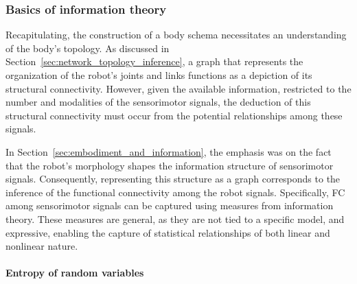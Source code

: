 \subsubsection{Basics of information theory}
Recapitulating, the construction of a body schema necessitates an understanding of the body's topology. As discussed in Section~\ref{sec:network_topology_inference}, a graph that represents the organization of the robot's joints and links functions as a depiction of its structural connectivity. However, given the available information, restricted to the number and modalities of the sensorimotor signals, the deduction of this structural connectivity must occur from the potential relationships among these signals.

In Section~\ref{sec:embodiment_and_information}, the emphasis was on the fact that the robot's morphology shapes the information structure of sensorimotor signals. Consequently, representing this structure as a graph corresponds to the inference of the functional connectivity among the robot signals. Specifically, FC among sensorimotor signals can be captured using measures from information theory\cite{Cover1999Elementsinformationtheory}. These measures are general, as they are not tied to a specific model, and expressive, enabling the capture of statistical relationships of both linear and nonlinear nature.

\paragraph*{Entropy of random variables}

